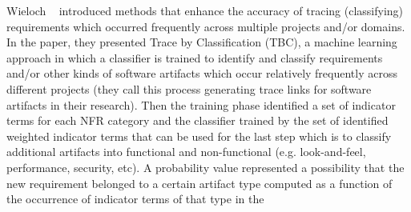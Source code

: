 Wieloch \etal~\cite{Wieloch:2013} introduced methods that enhance the accuracy
of tracing (classifying) requirements which occurred frequently across multiple
projects and/or domains. In the paper, they presented Trace by Classification
(TBC), a machine learning approach in which a classifier is trained to identify
and classify requirements and/or other kinds of software artifacts which occur
relatively frequently across different projects (they call this process
generating trace links for software artifacts in their research).  Then the training phase identified a set of indicator
terms for each NFR category and the classifier trained by the
set of identified weighted indicator terms that can be used for the last step which is to classify additional
artifacts into functional and non-functional (e.g.
look-and-feel, performance, security, etc). A probability value represented 
a possibility that the new requirement belonged to a certain artifact type
computed as a function of the occurrence of indicator terms of that type in the
